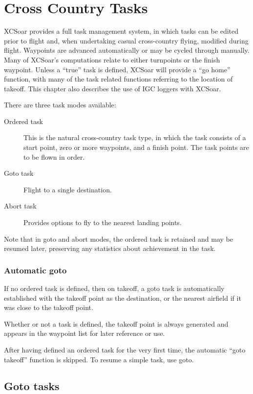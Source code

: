
\chapter{Cross Country Tasks}\label{cha:tasks}

XCSoar provides a full task management system, in which tasks can be
edited prior to flight and, when undertaking casual cross-country
flying, modified during flight.  Waypoints are advanced automatically
or may be cycled through manually. Many of XCSoar's computations relate to
either turnpoints or the finish waypoint.
Unless a ``true'' task is defined, XCSoar will provide a ``go home'' function, with
many of the task related functions referring to the location of takeoff.
This chapter also describes the use of IGC loggers with XCSoar.

There are three task modes available:
\begin{description}
\item[Ordered task] This is the natural cross-country task type,
in which the task consists of a start point, zero or more waypoints,
and a finish point.  The task points are to be flown in order.
\item[Goto task] Flight to a single destination.
\item[Abort task] Provides options to fly to the nearest landing points.
\end{description}

Note that in goto and abort modes, the ordered task is retained and may be resumed
later, preserving any statistics about achievement in the task.

\subsection*{Automatic goto}

If no ordered task is defined, then on takeoff, a goto task is automatically
established with the takeoff point as the destination, or the nearest airfield
if it was close to the takeoff point.

Whether or not a task is defined, the takeoff point is always
generated and appears in the waypoint list for later reference or use.

After having defined an ordered task for the very first time, the automatic ``goto takeoff'' function is skipped. To resume a simple task, use goto.

\section{Goto tasks}

